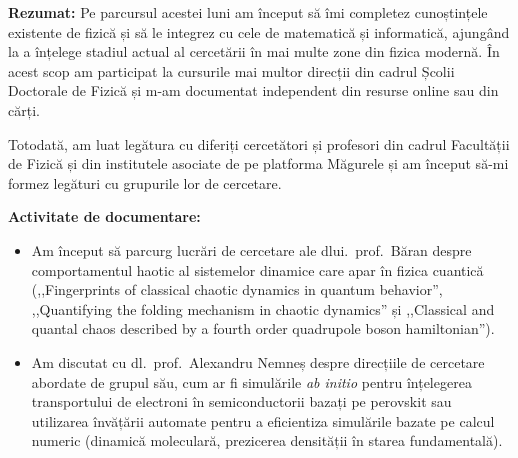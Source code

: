 
\makereportpreamble

\textbf{Rezumat:} Pe parcursul acestei luni am început să îmi completez cunoștințele existente de fizică și să le integrez cu cele de matematică și informatică, ajungând la a înțelege stadiul actual al cercetării în mai multe zone din fizica modernă. În acest scop am participat la cursurile mai multor direcții din cadrul Școlii Doctorale de Fizică și m-am documentat independent din resurse online sau din cărți. 

Totodată, am luat legătura cu diferiți cercetători și profesori din cadrul Facultății de Fizică și din institutele asociate de pe platforma Măgurele și am început să-mi formez legături cu grupurile lor de cercetare.
\vspace{0.5em}

\textbf{Activitate de documentare:}

\begin{itemize}
    \item Am început să parcurg lucrări de cercetare ale dlui.~prof.~Băran despre comportamentul haotic al sistemelor dinamice care apar în fizica cuantică (,,Fingerprints of classical chaotic dynamics in quantum behavior'', ,,Quantifying the folding mechanism in chaotic dynamics'' și ,,Classical and quantal chaos described by a fourth order quadrupole boson hamiltonian'').

    \item Am discutat cu dl.~prof.~Alexandru Nemneș despre direcțiile de cercetare abordate de grupul său, cum ar fi simulările \emph{ab initio} pentru înțelegerea transportului de electroni în semiconductorii bazați pe perovskit sau utilizarea învățării automate pentru a eficientiza simulările bazate pe calcul numeric (dinamică moleculară, prezicerea densității în starea fundamentală).
\end{itemize}
\vspace{0.5em}

